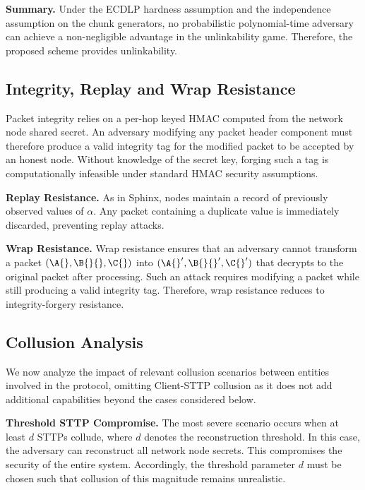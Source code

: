 \smallskip
\noindent\textbf{Summary.}
Under the ECDLP hardness assumption and the independence assumption on the chunk generators, no probabilistic polynomial-time adversary can achieve a non-negligible advantage in the unlinkability game.
Therefore, the proposed scheme provides unlinkability.


\subsection{Integrity, Replay and Wrap Resistance}\label{sec:integrity_forgery}

Packet integrity relies on a per-hop keyed HMAC computed from the network node shared secret.
An adversary modifying any packet header component must therefore produce a valid integrity tag for the modified packet to be accepted by an honest node.
Without knowledge of the secret key, forging such a tag is computationally infeasible under standard HMAC security assumptions.

\smallskip
\noindent\textbf{Replay Resistance.}\label{replay_resistance}
As in Sphinx, nodes maintain a record of previously observed values of $\alpha$.
Any packet containing a duplicate value is immediately discarded, preventing replay attacks.

\smallskip
\noindent\textbf{Wrap Resistance.}\label{wrap_resistance}
Wrap resistance ensures that an adversary cannot transform a packet $(\A{},\B{}{},\C{})$ into $(\A{}',\B{}{}',\C{}')$ that decrypts to the original packet after processing.
Such an attack requires modifying a packet while still producing a valid integrity tag.
Therefore, wrap resistance reduces to integrity-forgery resistance.



\subsection{Collusion Analysis}\label{sec:collusion}

We now analyze the impact of relevant collusion scenarios between entities involved in the protocol, 
omitting Client-STTP collusion as it does not add additional capabilities beyond the cases considered below.

\smallskip
\noindent\textbf{Threshold STTP Compromise.}
The most severe scenario occurs when at least $d$ STTPs collude, where $d$ denotes the reconstruction threshold.
In this case, the adversary can reconstruct all network node secrets.
This compromises the security of the entire system.
Accordingly, the threshold parameter $d$ must be chosen such that collusion of this magnitude remains unrealistic.

